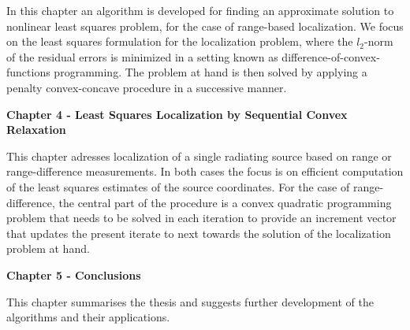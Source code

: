 \phantom{m}

\noindent
In this chapter an algorithm is developed for finding an approximate solution to nonlinear least squares problem, for the case of range-based localization. We focus on the least squares formulation for the localization problem, where the $l_2$-norm of the residual errors is minimized in a setting known as difference-of-convex-functions programming. The problem at hand is then solved by applying a penalty convex-concave procedure in a successive manner.


\phantom{m}

\noindent
\textbf{Chapter 4 - Least Squares Localization by Sequential Convex Relaxation}


\phantom{m}

\noindent
This chapter adresses localization of a single radiating source based on range or range-difference measurements. In both cases the focus is on efficient computation of the least squares estimates of the source coordinates. For the case of range-difference, the central part of the procedure is a convex quadratic programming problem that needs to be solved in each iteration to provide an increment vector that updates the present iterate to next towards the solution of the localization problem at hand.

\phantom{m}

\noindent
\textbf{Chapter 5 - Conclusions}

\phantom{m}

\noindent
This chapter summarises the thesis and suggests  further development of the algorithms and their applications.
